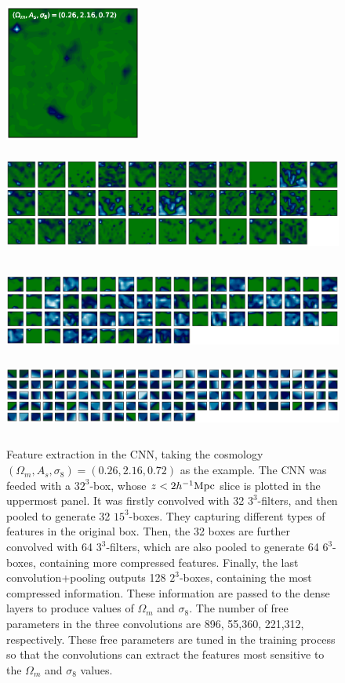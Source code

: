 \documentclass[twocolumn]{aastex61}
\begin{document}
\begin{figure}
   \centering
    \includegraphics[height=4.5cm]{layeroutput_10.eps}
    \includegraphics[height=4cm]{layeroutput_11.eps}
    \includegraphics[height=3cm]{layeroutput_12.eps}
    \includegraphics[height=2.5cm]{layeroutput_13.eps}
   \caption{\label{fig_layers1}
   Feature extraction in the CNN, taking the cosmology $(\Omega_m, A_s, \sigma_8)=(0.26, 2.16, 0.72)$ as the example. 
   The CNN was feeded with a $32^3$-box, whose $z<2 h^{-1} \rm Mpc$ slice is plotted in the uppermost panel.
   It was firstly convolved with 32 $3^3$-filters,
   and then pooled to generate 32 $15^3$-boxes.
   They capturing different types of features in the original box.
   Then, the 32 boxes are further convolved with 64 $3^3$-filters,
   which are also pooled to generate 64 $6^3$-boxes, 
   containing more compressed features.
   Finally, the last convolution+pooling outputs 128 $2^3$-boxes, 
   containing the most compressed information.
   These information are passed to the dense layers to produce 
   values of $\Omega_m$ and $\sigma_8$.
   The number of free parameters in the three convolutions are
   896, 55,360, 221,312, respectively.
   These free parameters are tuned in the training process 
    so that the convolutions can extract the features most sensitive to the 
    $\Omega_m$ and $\sigma_8$ values.
   }
\end{figure}
\end{document}

